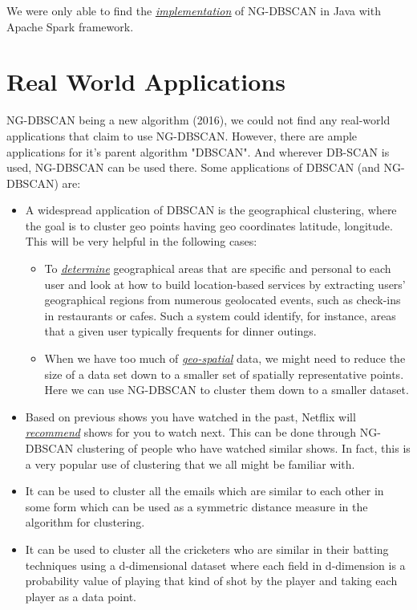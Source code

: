\documentclass[acmsmall]{acmart}
\begin{document}
We were only able to find the  \href{https://github.com/alessandrolulli/gdbscan}{\textit{\underline{implementation}}} of NG-DBSCAN in Java with Apache Spark framework.

\section* {Real World Applications}
NG-DBSCAN being a new algorithm (2016), we could not find any real-world applications that claim to use NG-DBSCAN. However, there are ample applications for it's parent algorithm "DBSCAN". And wherever DB-SCAN is used, NG-DBSCAN can be used there.
Some applications of DBSCAN (and NG-DBSCAN) are:
\begin{itemize}
\item A widespread application of DBSCAN is the geographical clustering, where the goal is to cluster geo points having geo coordinates latitude, longitude. This will be very helpful in the following cases:
\begin{itemize}
    \item To \href{https://www.oreilly.com/content/clustering-geolocated-data-using-spark-and-dbscan/}{\textit{\underline{determine}}} geographical areas that are specific and personal to each user and look at how to build location-based services by extracting users’ geographical regions from numerous geolocated events, such as check-ins in restaurants or cafes. Such a system could identify, for instance, areas that a given user typically frequents for dinner outings.
    \item When we have too much of \href{https://geoffboeing.com/2014/08/clustering-to-reduce-spatial-data-set-size/}{\textit{\underline{geo-spatial}}} data, we might need to reduce the size of a data set down to a smaller set of spatially representative points. Here we can use NG-DBSCAN to cluster them down to a smaller dataset.
\end{itemize}
\item Based on previous shows you have watched in the past, Netflix will \href{https://elutins.medium.com/dbscan-what-is-it-when-to-use-it-how-to-use-it-8bd506293818}{\textit{\underline{recommend}}} shows for you to watch next. This can be done through NG-DBSCAN clustering of people who have watched similar shows. In fact, this is a very popular use of clustering that we all might be familiar with.
\item It can be used to cluster all the emails which are similar to each other in some form which can be used as a symmetric distance measure in the algorithm for clustering.
\item It can be used to cluster all the cricketers who are similar in their batting techniques using a d-dimensional dataset where each field in d-dimension is a probability value of playing that kind of shot by the player and taking each player as a data point.  
\end{itemize}
\end{document}
